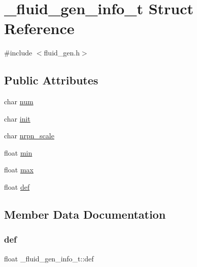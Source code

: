 \hypertarget{struct__fluid__gen__info__t}{}\section{\+\_\+fluid\+\_\+gen\+\_\+info\+\_\+t Struct Reference}
\label{struct__fluid__gen__info__t}


{\ttfamily \#include $<$fluid\+\_\+gen.\+h$>$}

\subsection*{Public Attributes}
\begin{DoxyCompactItemize}
\item 
char \hyperlink{struct__fluid__gen__info__t_a9bf766e8ce67f4086ca77a9d44f7e94b}{num}
\item 
char \hyperlink{struct__fluid__gen__info__t_aef7034d8e23aea99d5d7217c27f401ca}{init}
\item 
char \hyperlink{struct__fluid__gen__info__t_a00afe7791c60b323e53cbde04f6d8b97}{nrpn\+\_\+scale}
\item 
float \hyperlink{struct__fluid__gen__info__t_ade2865af096a3fed0cfc879e90142058}{min}
\item 
float \hyperlink{struct__fluid__gen__info__t_a9de8e5d8146a85057911236b4ec15acf}{max}
\item 
float \hyperlink{struct__fluid__gen__info__t_aae3af42bd32328a47220229528f60152}{def}
\end{DoxyCompactItemize}


\subsection{Member Data Documentation}
\mbox{\label{struct__fluid__gen__info__t_aae3af42bd32328a47220229528f60152}} 
\subsubsection{\texorpdfstring{def}{def}}
{\footnotesize\ttfamily float \+\_\+fluid\+\_\+gen\+\_\+info\+\_\+t\+::def}

\mbox{\label{struct__fluid__gen__info__t_aef7034d8e23aea99d5d7217c27f401ca}} 
